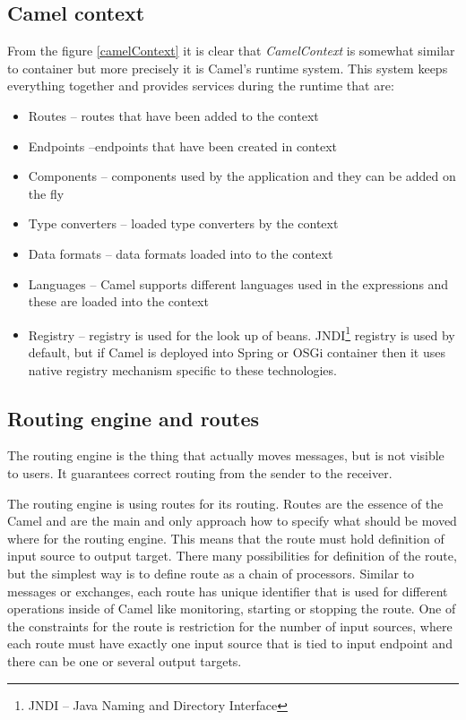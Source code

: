 \documentclass[12pt,final,oneside]{fithesis2}
\begin{document}
\subsection*{Camel context}
From the figure \ref{camelContext} it is clear that \textit{CamelContext} is somewhat similar to container but more precisely it is Camel's runtime system. This system keeps everything together and provides services during the runtime that are:
\begin{itemize}
\item
Routes -- routes that have been added to the context

\item
Endpoints --endpoints that have been created in context

\item
Components -- components used by the application and they can be added on the fly

\item
Type converters -- loaded type converters by the context

\item
Data formats -- data formats loaded into to the context

\item
Languages -- Camel supports different languages used in the expressions and these are loaded into the context

\item
Registry -- registry is used for the look up of beans. JNDI\footnote{JNDI -- Java Naming and Directory Interface} registry is used by default, but if Camel is deployed into Spring or OSGi container then it uses native registry mechanism specific to these technologies.

\end{itemize}

\subsection*{Routing engine and routes}
The routing engine is the thing that actually moves messages, but is not visible to users. It guarantees correct routing from the sender to the receiver.

The routing engine is using routes for its routing. Routes are the essence of the Camel and are the main and only approach how to specify what should be moved where for the routing engine. This means that the route must hold definition of input source to output target. There many possibilities for definition of the route, but the simplest way is to define route as a chain of processors\cite{camel-in-action}. Similar to messages or exchanges, each route has unique identifier that is used for different operations inside of Camel like monitoring, starting or stopping the route. One of the constraints for the route is restriction for the number of input sources, where each route must have exactly one input source that is tied to input endpoint and there can be one or several output targets.
\end{document}
